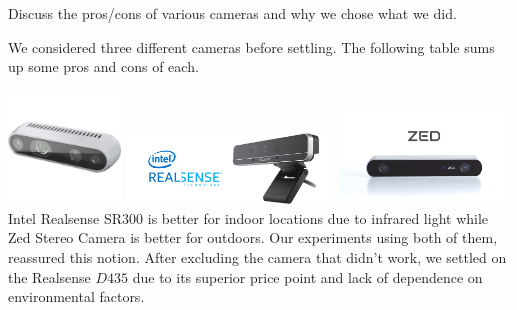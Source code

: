 \documentclass[a0paper,portrait]{baposter}
\begin{document}
\begin{poster}
{Discuss the pros/cons of various cameras and why we chose what we did.

We considered three different cameras before settling. The following table sums up some pros and cons of each.

\includegraphics[width = 3.0cm]{Realsense1}
\includegraphics[width = 5.5cm]{intel2} \hspace{1cm}
\includegraphics[width = 4.5cm]{ZED} \hspace{2cm}
\\ Intel Realsense SR$300$ is better for indoor locations due to infrared light while Zed Stereo Camera is better for outdoors. Our experiments using both of them, reassured this notion. After excluding the camera that didn't work, we settled on the Realsense $D435$ due to its superior price point and lack of dependence on environmental factors.
}


\end{poster}
\end{document}
